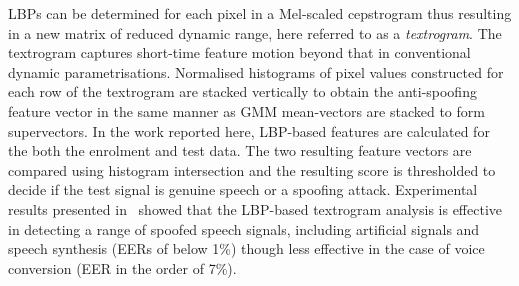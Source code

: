 LBPs can be determined for each pixel in a Mel-scaled cepstrogram thus resulting in a new matrix of reduced dynamic range, here referred to as a \emph{textrogram}.  
The textrogram captures short-time feature motion beyond that in conventional dynamic parametrisations.  
Normalised histograms of pixel values constructed for each row of the textrogram   are stacked vertically to obtain the anti-spoofing feature vector in the same manner as GMM mean-vectors are stacked to form supervectors.  
In the work reported here, LBP-based features are calculated for the both the enrolment and test data.  The two resulting feature vectors are compared using histogram intersection and the resulting score is thresholded to decide if the test signal is genuine speech or a spoofing attack.
Experimental results presented in~\cite{Alegre2013a} showed that the LBP-based textrogram analysis is effective in detecting a range of spoofed speech signals, including artificial signals and speech synthesis (EERs of below 1\%) though less effective in the case of voice conversion (EER in the order of 7\%).




